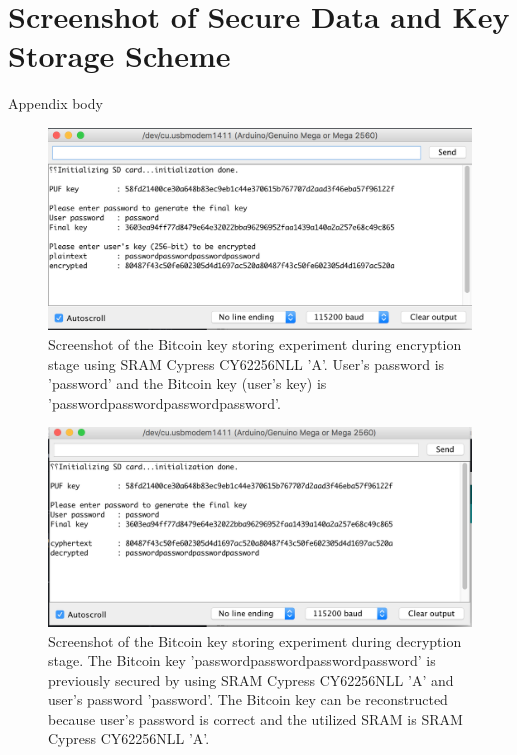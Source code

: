 \chapter{Screenshot of Secure Data and Key Storage Scheme}
\label{app:screenshot}
Appendix body

\begin{figure}[tph!]
    \centerline{\includegraphics[width={\textwidth}]{images/A_encrypt}}
    \caption{Screenshot of the Bitcoin key storing experiment during encryption stage using SRAM Cypress CY62256NLL 'A'.
    User's password is 'password' and the Bitcoin key (user's key) is 'passwordpasswordpasswordpassword'.}
    \label{fig:A_encrypt}
\end{figure}

\begin{figure}[tph!]
    \centerline{\includegraphics[width={\textwidth}]{images/A_decrypt_correct}}
    \caption{Screenshot of the Bitcoin key storing experiment during decryption stage. The Bitcoin key 'passwordpasswordpasswordpassword' is previously secured by using SRAM Cypress CY62256NLL 'A' and user's password 'password'.
    The Bitcoin key can be reconstructed because user's password is correct and the utilized SRAM is SRAM Cypress CY62256NLL 'A'.}
    \label{fig:A_decrypt_correct}
\end{figure}

